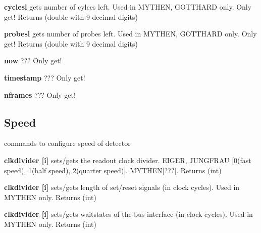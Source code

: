\begin{DoxyItemize}
\item {\bfseries cyclesl} gets number of cylces left. Used in MYTHEN, GOTTHARD only. Only get! {\ttfamily Returns} {\ttfamily }(double with 9 decimal digits)
\end{DoxyItemize}


\begin{DoxyItemize}
\item {\bfseries probesl} gets number of probes left. Used in MYTHEN, GOTTHARD only. Only get! {\ttfamily Returns} {\ttfamily }(double with 9 decimal digits)
\end{DoxyItemize}


\begin{DoxyItemize}
\item {\bfseries now} ??? Only get!
\end{DoxyItemize}


\begin{DoxyItemize}
\item {\bfseries timestamp} ??? Only get!
\end{DoxyItemize}


\begin{DoxyItemize}
\item {\bfseries nframes} ??? Only get!
\end{DoxyItemize}\hypertarget{config_configspeed}{}\subsection{Speed}\label{config_configspeed}
commands to configure speed of detector


\begin{DoxyItemize}
\item {\bfseries clkdivider \mbox{[}i\mbox{]}} sets/gets the readout clock divider. EIGER, JUNGFRAU \mbox{[}0(fast speed), 1(half speed), 2(quarter speed)\mbox{]}. MYTHEN\mbox{[}???\mbox{]}. {\ttfamily Returns} {\ttfamily }(int)
\end{DoxyItemize}


\begin{DoxyItemize}
\item {\bfseries clkdivider \mbox{[}i\mbox{]}} sets/gets length of set/reset signals (in clock cycles). Used in MYTHEN only. {\ttfamily Returns} {\ttfamily }(int)
\end{DoxyItemize}


\begin{DoxyItemize}
\item {\bfseries clkdivider \mbox{[}i\mbox{]}} sets/gets waitstates of the bus interface (in clock cycles). Used in MYTHEN only. {\ttfamily Returns} {\ttfamily }(int)
\end{DoxyItemize}


